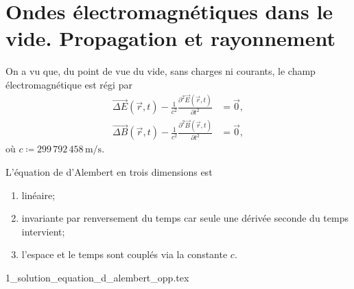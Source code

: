 \chapter[Ondes dans le vide]{Ondes électromagnétiques dans le vide. Propagation et rayonnement}

On a vu que, du point de vue du vide, sans charges ni courants, le champ électromagnétique est régi par
\begin{equation}
    \boxed{
        \begin{aligned}
            \vec{\Delta E}(\vec{r},t)-\frac{1}{c^{2}}\frac{\partial ^{2}\vec{E}(\vec{r},t)}{\partial t^{2}}&=\vec{0},\\
            \vec{\Delta B}(\vec{r},t)-\frac{1}{c^{2}}\frac{\partial ^{2}\vec{B}(\vec{r},t)}{\partial t^{2}}&=\vec{0},
        \end{aligned}
    }
\end{equation}
où $c\coloneqq 299\,792\,458\,\si{\metre\per\second}$.

L'équation de d'Alembert en trois dimensions est
\begin{enumerate}[label=(\roman*)]
    \item linéaire;
    \item invariante par renversement du temps car seule une dérivée seconde du temps intervient;
    \item l'espace et le temps sont couplés via la constante $c$.
\end{enumerate}


\minitoc

{1_solution_equation_d_alembert_opp.tex}
